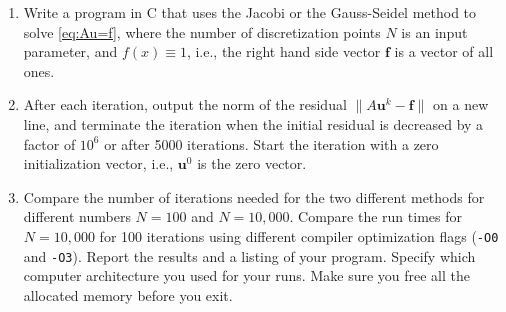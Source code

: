 \documentclass[11pt]{article}
\newcommand{\bs}{\boldsymbol}
\begin{document}
\begin{enumerate}
  \begin{enumerate}
  \item Write a program in C that uses the Jacobi or the Gauss-Seidel
    method to solve \eqref{eq:Au=f}, where the number of
    discretization points $N$ is an input parameter, and $f(x)\equiv
    1$, i.e., the right hand side vector $\bs f$ is a vector of all
    ones.
  \item After each iteration, output the norm of the residual $\|A\bs
    u^k - \bs f\|$ on a new line, and terminate the iteration when the
    initial residual is decreased by a factor of $10^6$ or after 5000
    iterations. Start the iteration with a zero initialization vector,
    i.e., $\bs u^0$ is the zero vector.
  \item Compare the number of iterations needed for the two different
    methods for different numbers $N=100$ and $N=10,000$. Compare the
    run times for $N=10,000$ for 100 iterations using different
    compiler optimization flags (\texttt{-O0} and
    \texttt{-O3}). Report the results and a listing of your
    program. Specify which computer architecture you used for your
    runs.  Make sure you free all the allocated memory before you
    exit.
  \end{enumerate}
\end{enumerate}
\end{document}
